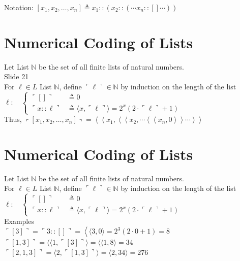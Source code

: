 \documentclass[10pt]{article}
\begin{document}
Notation: $\left[x_{1}, x_{2}, \ldots, x_{n}\right] \triangleq x_{1}::\left(x_{2}::\left(\cdots x_{n}::[] \cdots\right)\right)$

\section*{Numerical Coding of Lists}
Let List $\mathbb{N}$ be the set of all finite lists of natural numbers.\\
Slide 21\\
For $\ell \in L$ List $\mathbb{N}$, define $\ulcorner\ell\urcorner \in \mathbb{N}$ by induction on the length of the list\\
$\ell: \quad\left\{\begin{aligned}\ulcorner[]\urcorner & \triangleq 0 \\ \ulcorner x:: \ell\urcorner & \triangleq\langle x,\ulcorner\ell\urcorner\rangle=2^{x}(2 \cdot\ulcorner\ell\urcorner+1)\end{aligned}\right.$\\
Thus, $\left\ulcorner\left[x_{1}, x_{2}, \ldots, x_{n}\right]\right\urcorner=\left\langle\left\langle x_{1},\left\langle\left\langle x_{2}, \cdots\left\langle\left\langle x_{n}, 0\right\rangle\right\rangle \cdots\right\rangle\right\rangle\right.\right.$

\section*{Numerical Coding of Lists}
Let List $\mathbb{N}$ be the set of all finite lists of natural numbers.\\
For $\ell \in L$ List $\mathbb{N}$, define $\ulcorner\ell\urcorner \in \mathbb{N}$ by induction on the length of the list\\
$\ell: \quad\left\{\begin{aligned}\ulcorner[]\urcorner & \triangleq 0 \\ \ulcorner x:: \ell\urcorner & \triangleq\langle x,\ulcorner\ell\urcorner\rangle=2^{x}(2 \cdot\ulcorner\ell\urcorner+1)\end{aligned}\right.$\\
Examples\\
$\ulcorner[3]\urcorner=\ulcorner 3::[]\urcorner=\left\langle\langle 3,0\rangle=2^{3}(2 \cdot 0+1)=8\right.$\\
$\ulcorner[1,3]\urcorner=\langle\langle 1,\ulcorner[3]\urcorner\rangle=\langle\langle 1,8\rangle=34$\\
$\ulcorner[2,1,3]\urcorner=\langle 2,\ulcorner[1,3]\urcorner\rangle=\langle 2,34\rangle=276$
\end{document}
